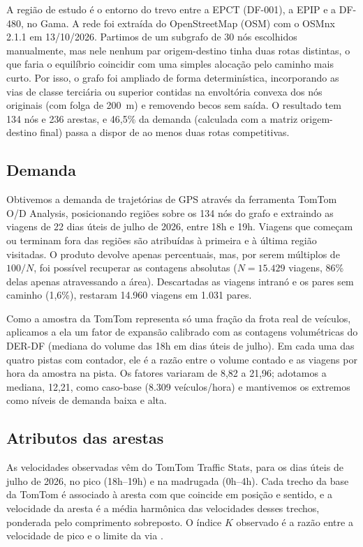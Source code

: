 \documentclass[portuguese]{sbc2025}%
\begin{document}
A região de estudo é o entorno do trevo entre a EPCT (DF-001), a EPIP e a DF-480, no Gama. A rede foi extraída do OpenStreetMap (OSM) com o OSMnx 2.1.1 em 13/10/2026. Partimos de um subgrafo de 30 nós escolhidos manualmente, mas nele nenhum par origem-destino tinha duas rotas distintas, o que faria o equilíbrio coincidir com uma simples alocação pelo caminho mais curto. Por isso, o grafo foi ampliado de forma determinística, incorporando as vias de classe terciária ou superior contidas na envoltória convexa dos nós originais (com folga de 200~m) e removendo becos sem saída. O resultado tem 134 nós e 236 arestas, e 46,5\% da demanda (calculada com a matriz origem-destino final) passa a dispor de ao menos duas rotas competitivas.

\subsection{Demanda}
Obtivemos a demanda de trajetórias de GPS através da ferramenta TomTom O/D Analysis, posicionando regiões sobre os 134 nós do grafo e extraindo as viagens de 22 dias úteis de julho de 2026, entre 18h e 19h. Viagens que começam ou terminam fora das regiões são atribuídas à primeira e à última região visitadas. O produto devolve apenas percentuais, mas, por serem múltiplos de $100/N$, foi possível recuperar as contagens absolutas ($N=15.429$ viagens, 86\% delas apenas atravessando a área). Descartadas as viagens intranó e os pares sem caminho (1,6\%), restaram 14.960 viagens em 1.031 pares.

Como a amostra da TomTom representa só uma fração da frota real de veículos, aplicamos a ela um fator de expansão calibrado com as contagens volumétricas do DER-DF (mediana do volume das 18h em dias úteis de julho). Em cada uma das quatro pistas com contador, ele é a razão entre o volume contado e as viagens por hora da amostra na pista. Os fatores variaram de 8,82 a 21,96; adotamos a mediana, 12,21, como caso-base (8.309 veículos/hora) e mantivemos os extremos como níveis de demanda baixa e alta.

\subsection{Atributos das arestas}
As velocidades observadas vêm do TomTom Traffic Stats, para os dias úteis de julho de 2026, no pico (18h--19h) e na madrugada (0h--4h). Cada trecho da base da TomTom é associado à aresta com que coincide em posição e sentido, e a velocidade da aresta é a média harmônica das velocidades desses trechos, ponderada pelo comprimento sobreposto. O índice $K$ observado é a razão entre a velocidade de pico e o limite da via \cite{he2016spi}.
\end{document}
